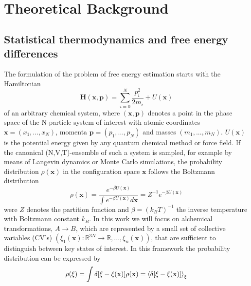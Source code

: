\chapter{Theoretical Background}
\label{cha:theory}

\section{Statistical thermodynamics and free energy differences}
\label{sec:freeE}

The formulation of the problem of free energy estimation starts with the Hamiltonian
\begin{equation}
  \textbf{H}(\textbf{x},\textbf{p})=\sum_{i=0}^{N}\frac{p_{i}^{ 2}}{2 m_i} + U(\textbf{x})
  \label{eq:lagrangian}
\end{equation}
of an arbitrary chemical system, where $(\textbf{x},\textbf{p})$ denotes a point in the phase space of the N-particle system of interest with atomic coordinates $\textbf{x}=(x_1, ..., x_N)$, momenta $\textbf{p}=(p_1,...,p_N)$ and masses $(m_1,...,m_N)$. $U(\textbf{x})$ is the potential energy given by any quantum chemical method or force field. If the canonical (N,V,T)-ensemble of such a system is sampled, for example by means of Langevin dynamics or Monte Carlo simulations, the probability distribution $\rho(\textbf{x})$ in the configuration space $\textbf{x}$ follows the Boltzmann distribution
\begin{equation}
  \rho(\textbf{x})=\frac{e^{-\beta U(\textbf{x})}}{\int e^{-\beta U(\textbf{x})} d\textbf{x}}=Z^{-1}e^{-\beta U(\textbf{x})}
  \label{eq:boltzmann}
\end{equation}
were $Z$ denotes the partition function and $\beta=(k_B T)^{-1}$ the inverse temperature with Boltzmann constant $k_B$.
In this work we will focus on alchemical transformations, $A\longrightarrow B$, which are represented by a small set of collective variables (CV's) $(\xi_1(\textbf{x}) : \mathbb{R} ^{3N} \to \mathbb{R}, ..., \xi_n(\textbf{x}))$, that are sufficient to distinguish between key states of interest.
In this framework the probability distribution can be expressed by
\begin{equation}
  \rho(\xi)=\int \delta[\xi-\xi(\textbf{x})]\rho(\textbf{x})=\braket{\delta [\xi -\xi(\textbf{x})]}_\xi
  \label{eq:rho}
\end{equation}
